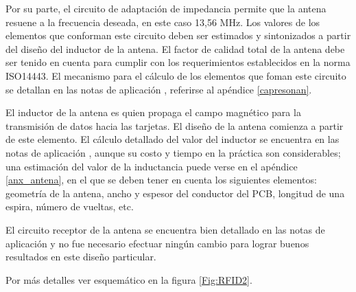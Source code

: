 \bigskip
{}

Por su parte, el circuito de adaptación de impedancia permite que la antena resuene a la frecuencia deseada, en este caso 13,56 MHz. Los valores de los elementos que conforman este circuito deben ser estimados y sintonizados a partir del diseño del inductor de la antena.
El factor de calidad total de la antena debe ser tenido en cuenta para cumplir con los requerimientos establecidos en la norma ISO14443. 
El mecanismo para el cálculo de los elementos que foman este circuito se detallan en las notas de aplicación \cite{MRICF}, referirse al apéndice \ref{capresonan}. 

\bigskip
{}

El inductor de la antena es quien propaga el campo magnético para la transmisión de datos hacia las tarjetas. El diseño de la antena comienza a partir de este elemento.
El cálculo detallado del valor del inductor se encuentra en las notas de aplicación \cite{ACD}, aunque su costo y tiempo en la práctica son considerables; una estimación del valor de la inductancia puede verse en el apéndice \ref{anx_antena}, en el que se deben tener en cuenta los siguientes elementos: geometría de la antena, ancho y espesor del conductor del PCB, longitud de una espira, número de vueltas, etc.

\bigskip
{} 

El circuito receptor de la antena se encuentra bien detallado en las notas de aplicación \cite{MRICF} y no fue necesario efectuar ningún cambio para lograr buenos resultados en este diseño particular. 

Por más detalles ver esquemático en la figura \ref{Fig:RFID2}.